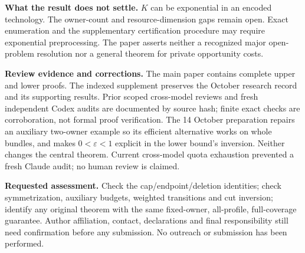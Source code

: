 \documentclass[11pt]{article}
\begin{document}
\textbf{What the result does not settle.} $K$ can be exponential in an encoded
technology. The owner-count and resource-dimension gaps remain open.
Exact enumeration and the supplementary certification procedure may require
exponential preprocessing. The paper asserts neither a recognized major
open-problem resolution nor a general theorem for private opportunity costs.

\textbf{Review evidence and corrections.} The main paper contains complete
upper and lower proofs. The indexed supplement preserves the October research
record and its supporting results. Prior scoped cross-model reviews and
fresh independent Codex audits are documented by source hash; finite exact
checks are corroboration, not formal proof verification. The 14 October
preparation repairs an auxiliary two-owner example so its efficient alternative
works on whole bundles, and makes $0<\varepsilon<1$ explicit in the lower
bound's inversion. Neither changes the central theorem. Current cross-model
quota exhaustion prevented a fresh Claude audit; no human review is claimed.

\textbf{Requested assessment.} Check the cap/endpoint/deletion identities;
check symmetrization, auxiliary budgets, weighted transitions and cut inversion;
identify any original theorem with the same fixed-owner, all-profile,
full-coverage guarantee. Author affiliation, contact, declarations and final
responsibility still need confirmation before any submission. No outreach
or submission has been performed.
\end{document}
